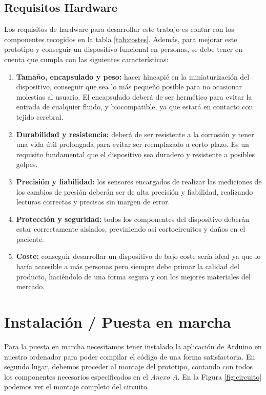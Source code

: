 \subsection{Requisitos Hardware}
Los requisitos de hardware para desarrollar este trabajo es contar con los componentes recogidos en la tabla \ref{tab:costes}. Además, para mejorar este prototipo y conseguir un dispositivo funcional en personas, se debe tener en cuenta que cumpla con las siguientes características:
\begin{enumerate}
    \item \textbf{Tamaño, encapsulado y peso:} hacer hincapié en la miniaturización del dispositivo, conseguir que sea lo más pequeño posible para no ocasionar molestias al usuario. El encapsulado deberá de ser hermético para evitar la entrada de cualquier fluido, y biocompatible, ya que estará en contacto con tejido cerebral.
    \item \textbf{Durabilidad y resistencia:} deberá de ser resistente a la corrosión y tener una vida útil prolongada para evitar ser reemplazado a corto plazo. Es un requisito fundamental que el dispositivo sea duradero y resistente a posibles golpes.
    \item \textbf{Precisión y fiabilidad:} los sensores encargados de realizar las mediciones de los cambios de presión deberán ser de alta precisión y fiabilidad, realizando lecturas correctas y precisas sin margen de error.
    \item \textbf{Protección y seguridad:} todos los componentes del dispositivo deberán estar correctamente aislados, previniendo así cortocircuitos y daños en el paciente. 
    \item \textbf{Coste:} conseguir desarrollar un dispositivo de bajo coste sería ideal ya que lo haría accesible a más personas pero siempre debe primar la calidad del producto, haciéndolo de una forma segura y con los mejores materiales del mercado.
\end{enumerate}


\section{Instalación / Puesta en marcha}
Para la puesta en marcha necesitamos tener instalado la aplicación de Arduino en nuestro ordenador para poder compilar el código de una forma satisfactoria. En segundo lugar, debemos proceder al montaje del prototipo, contando con todos los componentes necesarios especificados en el \textit{Anexo A}. En la Figura \ref{fig:circuito} podemos ver el montaje completo del circuito.

